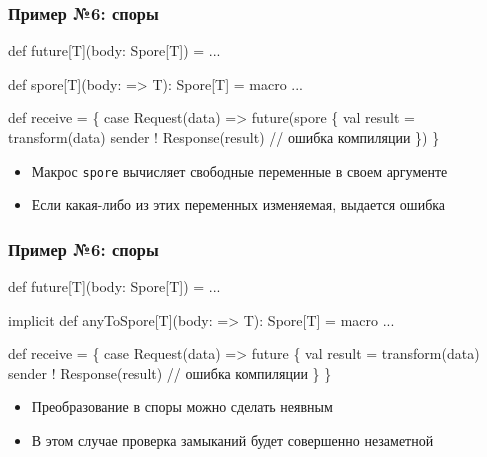 \documentclass[svgnames,hyperref={bookmarks=false},11pt]{beamer}
\begin{document}
\begin{frame}[fragile, t]
\frametitle{Пример №6: споры}

\begin{semiverbatim}
def future[T](body: \alert{Spore[T]}) = ...

\alert{def spore[T](body: => T): Spore[T] = macro ...}

def receive = \{
  case Request(data) =>
    future(\alert{spore \{}
      val result = transform(data)
      sender ! Response(result) \alert{// ошибка компиляции}
    \alert{\}})
\}

\end{semiverbatim}

\begin{itemize}
\item Макрос \texttt{spore} вычисляет свободные переменные в своем аргументе
\item Если какая-либо из этих переменных изменяемая, выдается ошибка
\end{itemize}
\end{frame}

\begin{frame}[fragile, t]
\frametitle{Пример №6: споры}

\begin{semiverbatim}
def future[T](body: Spore[T]) = ...

\alert{implicit def anyToSpore[T](body: => T): Spore[T] = macro ...}

def receive = \{
  case Request(data) =>
    future \alert{\{}
      val result = transform(data)
      sender ! Response(result) \alert{// ошибка компиляции}
    \alert{\}}
\}

\end{semiverbatim}

\begin{itemize}
\item Преобразование в споры можно сделать неявным
\item В этом случае проверка замыканий будет совершенно незаметной
\end{itemize}
\end{frame}

\begin{frame}[fragile]
\frametitle{}

\vskip40pt
\begin{center}
\end{center}
\end{frame}
\end{document}
